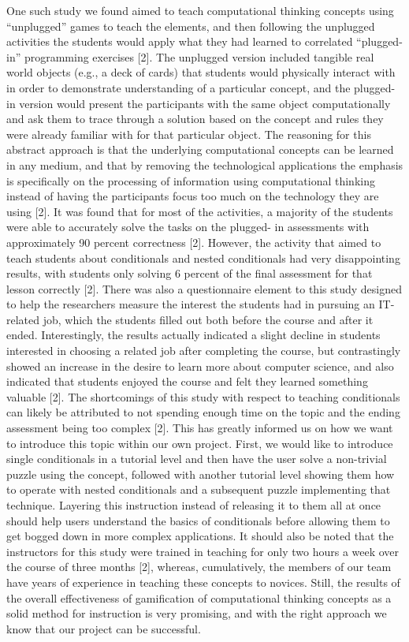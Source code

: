 One such study we found aimed to teach computational thinking concepts using
“unplugged” games to teach the elements, and then following the unplugged
activities the students would apply what they had learned to correlated
“plugged-in” programming exercises [2]. The unplugged version included tangible
real world objects (e.g., a deck of cards) that students would physically
interact with in order to demonstrate understanding of a particular concept, and
the plugged-in version would present the participants with the same object
computationally and ask them to trace through a solution based on the concept
and rules they were already familiar with for that particular object. The
reasoning for this abstract approach is that the underlying computational
concepts can be learned in any medium, and that by removing the technological
applications the emphasis is specifically on the processing of information using
computational thinking instead of having the participants focus too much on the
technology they are using [2]. It was found that for most of the activities, a
majority of the students were able to accurately solve the tasks on the plugged-
in assessments with approximately 90 percent correctness [2]. However, the
activity that aimed to teach students about conditionals and nested conditionals
had very disappointing results, with students only solving 6 percent of the final
assessment for that lesson correctly [2]. There was also a questionnaire element
to this study designed to help the researchers measure the interest the students
had in pursuing an IT-related job, which the students filled out both before the
course and after it ended. Interestingly, the results actually indicated a
slight decline in students interested in choosing a related job after completing
the course, but contrastingly showed an increase in the desire to learn more
about computer science, and also indicated that students enjoyed the course and
felt they learned something valuable [2]. The shortcomings of this study with
respect to teaching conditionals can likely be attributed to not spending enough
time on the topic and the ending assessment being too complex [2]. This has
greatly informed us on how we want to introduce this topic within our own
project. First, we would like to introduce single conditionals in a tutorial
level and then have the user solve a non-trivial puzzle using the concept,
followed with another tutorial level showing them how to operate with nested
conditionals and a subsequent puzzle implementing that technique. Layering this
instruction instead of releasing it to them all at once should help users
understand the basics of conditionals before allowing them to get bogged down in
more complex applications. It should also be noted that the instructors for this
study were trained in teaching for only two hours a week over the course of
three months [2], whereas, cumulatively, the members of our team have years of
experience in teaching these concepts to novices. Still, the results of the
overall effectiveness of gamification of computational thinking concepts as a
solid method for instruction is very promising, and with the right approach we
know that our project can be successful.\\


